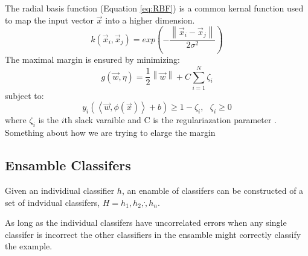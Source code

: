 The radial basis function (Equation \ref{eq:RBF}) is a common kernal function used to map the input vector $\vec{x}$ into a higher dimension.
\begin{equation}
\label{eq:RBF}
k \left ( \vec{x}_i , \vec{x}_j \right ) = exp \left ( - \frac{\left \| \vec{x}_i - \vec{x}_j \right \|}{2\sigma^2} \right ) 
\end{equation}
The maximal margin is ensured by minimizing:
\begin{equation}
\label{eq:Min}
g(\vec{w},\eta) = \frac{1}{2} \left \| \vec{w} \right \| + C \sum_{i=1}^N \zeta_i
\end{equation}
subject to:
\begin{equation}
\label{eq:Constraint}
y_i( \left \langle \vec{w},\phi(\vec{x}) \right \rangle + b ) \ge 1-\zeta_i, ~~~\zeta_i \ge 0
\end{equation}
where $\zeta_i$ is the $i$th slack varaible and C is the regulariazation parameter \cite{li_adaboost_2008}.
Something about how we are trying to elarge the margin

\subsection{Ensamble Classifers}
Given an individiual classifier $h$, an enamble of classifers can be constructed of a set of indvidual classifers, $H={h_1, h_2,\dot, h_n}$.

As long as the individual classifers have uncorrelated errors when any single classifer is incorrect the other classifiers in the ensamble might correctly classify the example.

